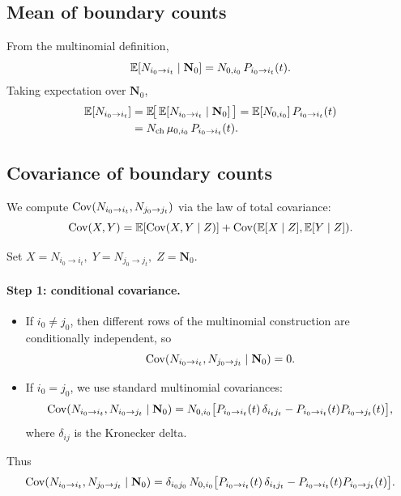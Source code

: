 \documentclass[11pt]{article}
\begin{document}
\subsection{Mean of boundary counts}

From the multinomial definition,
\[
  \mathbb{E}[N_{i_0\to i_t}\mid \mathbf{N}_0]
  =
  N_{0,i_0}\,P_{i_0\to i_t}(t).
\]
Taking expectation over \(\mathbf{N}_0\),
\begin{align}
  \mathbb{E}[N_{i_0\to i_t}]
  &=
  \mathbb{E}\!\bigl[\,\mathbb{E}[N_{i_0\to i_t}\mid \mathbf{N}_0]\,\bigr]
  =
  \mathbb{E}[N_{0,i_0}]\,P_{i_0\to i_t}(t)
  \nonumber\\
  &=
  N_{\text{ch}}\,\mu_{0,i_0}\,P_{i_0\to i_t}(t).
  \label{eq:boundary-mean}
\end{align}

\subsection{Covariance of boundary counts}

We compute
\(
  \operatorname{Cov}(N_{i_0\to i_t}, N_{j_0\to j_t})
\)
via the law of total covariance:
\[
  \operatorname{Cov}(X,Y)
  =
  \mathbb{E}[\operatorname{Cov}(X,Y\mid Z)] + \operatorname{Cov}(\mathbb{E}[X\mid Z],\mathbb{E}[Y\mid Z]).
\]

Set
\(
  X = N_{i_0\to i_t},\;
  Y = N_{j_0\to j_t},\;
  Z = \mathbf{N}_0.
\)

\paragraph{Step 1: conditional covariance.}

\begin{itemize}
  \item If \(i_0\neq j_0\), then different rows of the multinomial construction
  are conditionally independent, so
  \[
    \operatorname{Cov}(N_{i_0\to i_t}, N_{j_0\to j_t}\mid \mathbf{N}_0) = 0.
  \]
  \item If \(i_0 = j_0\), we use standard multinomial covariances:
  \[
    \operatorname{Cov}(N_{i_0\to i_t}, N_{i_0\to j_t}\mid \mathbf{N}_0)
    =
    N_{0,i_0}
    \bigl[
      P_{i_0\to i_t}(t)\,\delta_{i_t j_t}
      - P_{i_0\to i_t}(t)P_{i_0\to j_t}(t)
    \bigr],
  \]
  where \(\delta_{ij}\) is the Kronecker delta.
\end{itemize}
Thus
\begin{equation}
  \operatorname{Cov}(N_{i_0\to i_t}, N_{j_0\to j_t}\mid \mathbf{N}_0)
  =
  \delta_{i_0 j_0}\,
  N_{0,i_0}
  \bigl[
    P_{i_0\to i_t}(t)\,\delta_{i_t j_t}
    - P_{i_0\to i_t}(t)P_{i_0\to j_t}(t)
  \bigr].
  \label{eq:boundary-cond-cov}
\end{equation}
\end{document}
